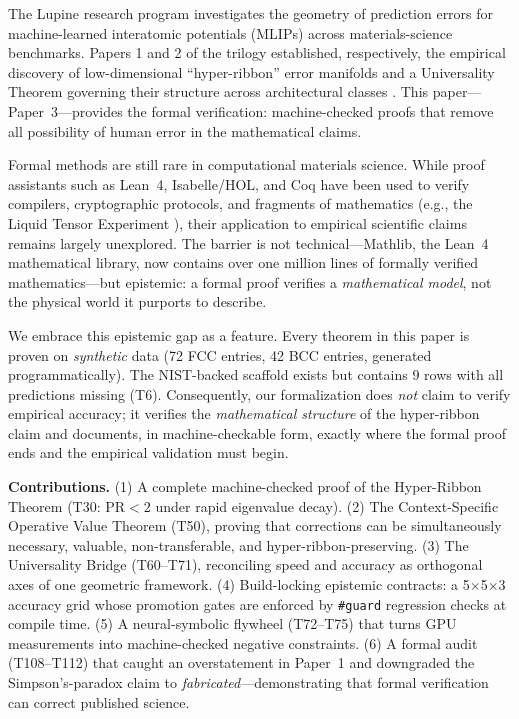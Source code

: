 \documentclass[11pt,a4paper]{article}
\theoremstyle{definition}
\theoremstyle{plain}
\begin{document}
The Lupine research program investigates the geometry of prediction errors for machine-learned interatomic potentials (MLIPs) across materials-science benchmarks. Papers 1 and 2 of the trilogy established, respectively, the empirical discovery of low-dimensional ``hyper-ribbon'' error manifolds and a Universality Theorem governing their structure across architectural classes \cite{welcing2025immi, welcing2025universal}. This paper---Paper~3---provides the formal verification: machine-checked proofs that remove all possibility of human error in the mathematical claims.

Formal methods are still rare in computational materials science. While proof assistants such as Lean~4, Isabelle/HOL, and Coq have been used to verify compilers, cryptographic protocols, and fragments of mathematics (e.g., the Liquid Tensor Experiment \cite{scholze2021liquid}), their application to empirical scientific claims remains largely unexplored. The barrier is not technical---Mathlib, the Lean~4 mathematical library, now contains over one million lines of formally verified mathematics---but epistemic: a formal proof verifies a \emph{mathematical model}, not the physical world it purports to describe.

We embrace this epistemic gap as a feature. Every theorem in this paper is proven on \emph{synthetic} data (72 FCC entries, 42 BCC entries, generated programmatically). The NIST-backed scaffold exists but contains 9 rows with all predictions missing (T6). Consequently, our formalization does \emph{not} claim to verify empirical accuracy; it verifies the \emph{mathematical structure} of the hyper-ribbon claim and documents, in machine-checkable form, exactly where the formal proof ends and the empirical validation must begin.

\textbf{Contributions.} (1) A complete machine-checked proof of the Hyper-Ribbon Theorem (T30: $\mathrm{PR} < 2$ under rapid eigenvalue decay). (2) The Context-Specific Operative Value Theorem (T50), proving that corrections can be simultaneously necessary, valuable, non-transferable, and hyper-ribbon-preserving. (3) The Universality Bridge (T60--T71), reconciling speed and accuracy as orthogonal axes of one geometric framework. (4) Build-locking epistemic contracts: a 5$\times$5$\times$3 accuracy grid whose promotion gates are enforced by \texttt{\#guard} regression checks at compile time. (5) A neural-symbolic flywheel (T72--T75) that turns GPU measurements into machine-checked negative constraints. (6) A formal audit (T108--T112) that caught an overstatement in Paper~1 and downgraded the Simpson's-paradox claim to \emph{fabricated}---demonstrating that formal verification can correct published science.
\end{document}
